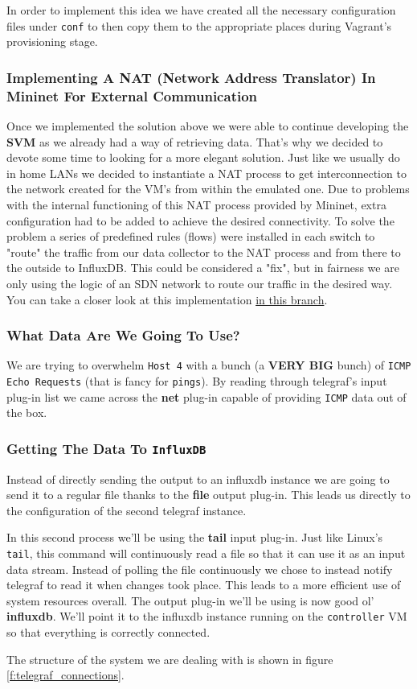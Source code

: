 \documentclass[12pt]{article}
\newcommand{\newpar} {
    \vskip 1cm
}
\begin{document}
			\newpar
			In order to implement this idea we have created all the necessary configuration files under \texttt{conf} to then copy them to the appropriate places during Vagrant's provisioning stage.

		\subsubsection{Implementing A NAT (\textbf{N}etwork \textbf{A}ddress \textbf{T}ranslator) In Mininet For External Communication}
			Once we implemented the solution above we were able to continue developing the \textbf{SVM} as we already had a way of retrieving data. That's why we decided to devote some time to looking for a more elegant solution. Just like we usually do in home LANs we decided to instantiate a NAT process to get interconnection to the network created for the VM's from within the emulated one. Due to problems with the internal functioning of this NAT process provided by Mininet, extra configuration had to be added to achieve the desired connectivity. To solve the problem a series of predefined rules (flows) were installed in each switch to "route" the traffic from our data collector to the NAT process and from there to the outside to InfluxDB.  This could be considered a "fix", but in fairness we are only using the logic of an SDN network to route our traffic in the desired way.  You can take a closer look at this implementation \href{https://github.com/GAR-Project/project/tree/full-connectivity}{in this branch}.

		\subsubsection{What Data Are We Going To Use?}
			We are trying to overwhelm \texttt{Host 4} with a bunch (a \textbf{VERY BIG} bunch) of \texttt{ICMP Echo Requests} (that is fancy for \texttt{pings}). By reading through telegraf's input plug-in list we came across the \textbf{net} plug-in capable of providing \texttt{ICMP} data out of the box.

		\subsubsection{Getting The Data To \texttt{InfluxDB}}
			Instead of directly sending the output to an influxdb instance we are going to send it to a regular file thanks to the \textbf{file} output plug-in. This leads us directly to the configuration of the second telegraf instance.
			\newpar
			In this second process we'll be using the \textbf{tail} input plug-in. Just like Linux's \texttt{tail}, this command will continuously read a file so that it can use it as an input data stream. Instead of polling the file continuously we chose to instead notify telegraf to read it when changes took place. This leads to a more efficient use of system resources overall. The output plug-in we'll be using is now good ol' \textbf{influxdb}. We'll point it to the influxdb instance running on the \texttt{controller} VM so that everything is correctly connected.
			\newpar
			The structure of the system we are dealing with is shown in figure \ref{f:telegraf_connections}.
\end{document}
